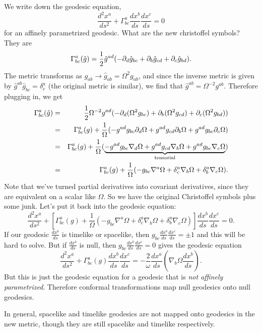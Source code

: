 We write down the geodesic equation,
$$\frac{d^2x^a}{ds^2}+\Gamma^a_{bc} \frac{dx^b}{ds}\frac{dx^c}{ds}=0$$ for an affinely parametrized geodesic. What are the new christoffel symbols? They are
$$\Gamma^a_{bc}(\hat g)=\frac{1}{2} \hat g^{ad}(-\partial_d \hat g_{bc}+\partial_b \hat g_{cd}+\partial_c \hat g_{bd}).$$
The metric transforms as $g_{ab}\to \hat g_{ab}=\Omega^2 g_{ab}$, and since the inverse metric is given by $\hat g^{ab}\hat g_{bc}=\delta^a_c$ (the original metric is similar), we find that $\hat g^{ab}=\Omega^{-2} g^{ab}.$ Therefore plugging in, we get
\begin{eqnarray*}
\Gamma^a_{bc}(\hat g)&=&\frac{1}{2} \Omega^{-2} g^{ad}(-\partial_d(\Omega^2 g_{bc})+\partial_b(\Omega^2 g_{cd})+\partial_c(\Omega^2 g_{bd}))\\
&=&\Gamma^a_{bc}(g)+\frac{1}{\Omega}(-g^{ad}g_{bc} \partial_d \Omega + g^{ad}g_{cd} \partial_b \Omega + g^{ad} g_{bc}\partial_c \Omega)\\
&=&\Gamma^a_{bc}(g)+\frac{1}{\Omega}(\underbrace{-g^{ad}g_{bc} \nabla_d \Omega + g^{ad}g_{cd} \nabla_b \Omega + g^{ad} g_{bc}\nabla_c \Omega}_{\text{tensorial}})\\
&=&\Gamma^a_{bc}(g)+\frac{1}{\Omega}(-g_{bc}\nabla^a \Omega +\delta^a_c \nabla_b \Omega +\delta^a_b \nabla_c \Omega).
\end{eqnarray*}
Note that we've turned partial derivatives into covariant derivatives, since they are equivalent on a scalar like $\Omega$. So we have the original Christoffel symbols plus some junk. Let's put it back into the geodesic equation:
$$\frac{d^2x^a}{ds^2}+\left[\Gamma^a_{bc}(g)+\frac{1}{\Omega}(-g_{bc}\nabla^a \Omega +\delta^a_c \nabla_b \Omega +\delta^a_b \nabla_c \Omega)\right]\frac{dx^b}{ds}\frac{dx^c}{ds}=0.$$
If our geodesic $\frac{dx^b}{ds}$ is timelike or spacelike, then $g_{bc}\frac{dx^b}{ds}\frac{dx^c}{ds}=\pm 1$ and this will be hard to solve. But if $\frac{dx^b}{ds}$ is null, then $g_{bc}\frac{dx^b}{ds}\frac{dx^c}{ds}=0$ gives the geodesic equation
$$\frac{d^2x^a}{ds^2}+\Gamma^a_{bc}(g)\frac{dx^b}{ds}\frac{dx^c}{ds}=-\frac{2}{\omega}\frac{dx^a}{ds}\left(\nabla_b \Omega \frac{dx^b}{ds}\right).$$
But this is just the geodesic equation for a geodesic that is \emph{not affinely parametrized}. Therefore conformal transformations map null geodesics onto null geodesics.

In general, spacelike and timelike geodesics are not mapped onto geodesics in the new metric, though they are still spacelike and timelike respectively.